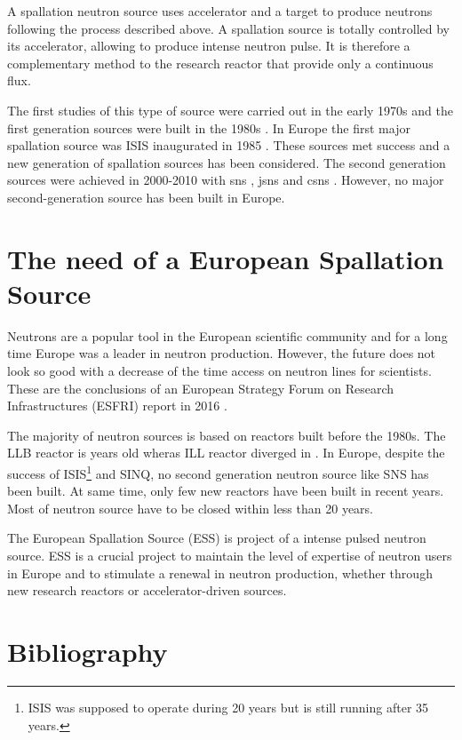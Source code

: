 \begin{refsection}
  A spallation neutron source uses accelerator and a target to produce neutrons following the process described above. A spallation source is totally controlled by its accelerator, allowing to produce intense neutron pulse. It is therefore a complementary method to the research reactor that provide only a continuous flux.

  The first studies of this type of source were carried out in the early 1970s and the first generation sources were built in the 1980s \cite{Klein}. In Europe the first major spallation source was ISIS inaugurated in 1985 \cite{THOMASON201961}. These sources met success and a new generation of spallation sources has been considered. The second generation sources were achieved in 2000-2010 with \acrshort{sns} \cite{Mason2005}, \acrshort{jsns} \cite{Ikeda2002} and \acrshort{csns} \cite{Chen2016}. However, no major second-generation source has been built in Europe.

  \section{The need of a European Spallation Source}
  \label{ch1:Summary}
  Neutrons are a popular tool in the European scientific community and for a long time Europe was a leader in neutron production. However, the future does not look so good with a decrease of the time access on neutron lines for scientists. These are the conclusions of an European Strategy Forum on Research Infrastructures (ESFRI) report in 2016 \cite{neutron2016}.

  The majority of neutron sources is based on reactors built before the 1980s.
  The LLB reactor is years old wheras ILL reactor diverged in . In Europe, despite the success of ISIS\footnote{ISIS was supposed to operate during 20 years but is still running after 35 years.} and SINQ, no second generation neutron source like SNS has been built. At same time, only few new reactors have been built in recent years. Most of neutron source have to be closed within less than 20 years.

  The European Spallation Source (ESS) is project of a intense pulsed neutron source. ESS is a crucial project to maintain the level of expertise of neutron users in Europe and to stimulate a renewal in neutron production, whether through new research reactors or accelerator-driven sources.

  

  \cleardoublepage
  \section{Bibliography}

  \printbibliography[heading=subbibliography]
\end{refsection}